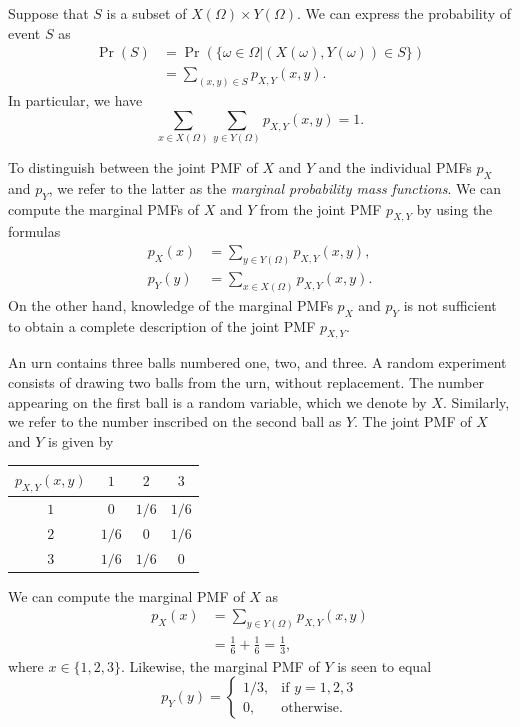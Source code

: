 Suppose that $S$ is a subset of $X(\Omega) \times Y(\Omega)$.
We can express the probability of event $S$ as
\begin{equation*}
\begin{split}
\Pr (S) &= \Pr (\{ \omega \in \Omega | (X(\omega), Y(\omega)) \in S \}) \\
&= \sum_{(x,y) \in S} p_{X,Y} (x, y) .
\end{split}
\end{equation*}
In particular, we have
\begin{equation*}
\sum_{x \in X(\Omega)} \sum_{y \in Y(\Omega)} p_{X,Y} (x, y) = 1.
\end{equation*}

To distinguish between the joint PMF of $X$ and $Y$ and the individual PMFs $p_X$ and $p_Y$, we refer to the latter as the \emph{marginal probability mass functions}.
We can compute the marginal PMFs of $X$ and $Y$ from the joint PMF $p_{X,Y}$ by using the formulas
\begin{align*}
p_X (x) &= \sum_{y \in Y(\Omega)} p_{X,Y} (x,y), \\
p_Y (y) &= \sum_{x \in X(\Omega)} p_{X,Y} (x,y).
\end{align*}
On the other hand, knowledge of the marginal PMFs $p_X$ and $p_Y$ is not sufficient to obtain a complete description of the joint PMF $p_{X,Y}$.

\begin{example} \label{example:JointPMFwoReplacement}
An urn contains three balls numbered one, two, and three.
A random experiment consists of drawing two balls from the urn, without replacement.
The number appearing on the first ball is a random variable, which we denote by $X$.
Similarly, we refer to the number inscribed on the second ball as $Y$.
The joint PMF of $X$ and $Y$ is given by
\begin{center}
\begin{tabular}{|c|c|c|c|}
\hline
$p_{X,Y} (x,y)$ & $1$ & $2$ & $3$ \\
\hline
$1$ & $0$ & $1/6$ & $1/6$ \\
\hline
$2$ & $1/6$ & $0$ & $1/6$ \\
\hline
$3$ & $1/6$ & $1/6$ & $0$ \\
\hline
\end{tabular}
\end{center}
We can compute the marginal PMF of $X$ as
\begin{equation*}
\begin{split}
p_X (x) &= \sum_{y \in Y(\Omega)} p_{X,Y} (x,y) \\
&= \frac{1}{6} + \frac{1}{6} = \frac{1}{3},
\end{split}
\end{equation*}
where $x \in \{1, 2, 3 \}$.
Likewise, the marginal PMF of $Y$ is seen to equal
\begin{equation*}
p_Y (y) = \left\{ \begin{array}{ll}
1/3, & \text{if }y = 1, 2, 3 \\
0, & \text{otherwise} .
\end{array} \right.
\end{equation*}
\end{example}

